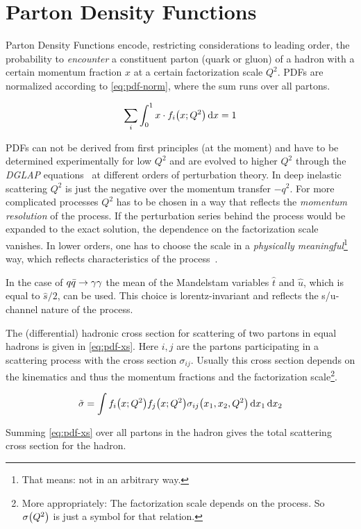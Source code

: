 \section{Parton Density Functions}%
\label{sec:pdf_basics}

Parton Density Functions encode, restricting considerations to leading
order, the probability to \emph{encounter} a constituent parton (quark
or gluon) of a hadron with a certain momentum fraction \(x\) at a
certain factorization scale \(Q^2\). PDFs are normalized according to
\cref{eq:pdf-norm}, where the sum runs over all partons.

\begin{equation}
  \label{eq:pdf-norm}
  \sum_i\int_0^1x\cdot f_i\qty(x;Q^2) \dd{x} = 1
\end{equation}


PDFs can not be derived from first principles (at the moment) and have
to be determined experimentally for low \(Q^2\) and are evolved to
higher \(Q^2\) through the \emph{DGLAP}
equations~\cite{altarelli:1977af} at different orders of perturbation
theory.  In deep inelastic scattering \(Q^2\) is just the negative
over the momentum transfer \(-q^2\). For more complicated processes
\(Q^2\) has to be chosen in a way that reflects the \emph{momentum
  resolution} of the process. If the perturbation series behind the
process would be expanded to the exact solution, the dependence on the
factorization scale vanishes. In lower orders, one has to choose the
scale in a \emph{physically meaningful}\footnote{That means: not in
  an arbitrary way.} way, which reflects characteristics of the
process~\cite{altarelli:1977af}.

In the case of \(q\bar{q}\rightarrow\gamma\gamma\) the mean of the Mandelstam variables \(\hat{t}\)
and \(\hat{u}\), which is equal to \(\hat{s}/2\), can be used. This
choice is lorentz-invariant and reflects the s/u-channel nature of the
process.

The (differential) hadronic cross section for scattering of two
partons in equal hadrons is given in \cref{eq:pdf-xs}. Here \(i,j\) are
the partons participating in a scattering process with the cross
section \(\sigma_{ij}\). Usually this cross section depends on the
kinematics and thus the momentum fractions and the factorization
scale\footnote{More appropriately: The factorization scale depends on
  the process. So \(\sigma\qty(Q^2)\) is just a symbol for that
  relation.}.

\begin{equation}
  \label{eq:pdf-xs}
  \tilde{\sigma} = \int f_i\qty(x;Q^2) f_j\qty(x;Q^2) \sigma_{ij}\qty(x_1,
  x_2, Q^2)\dd{x_1}\dd{x_2}
\end{equation}

Summing \cref{eq:pdf-xs} over all partons in the hadron gives
the total scattering cross section for the hadron.


